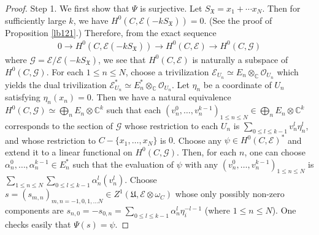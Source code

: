 \documentclass[12pt,a4paper,notitlepage]{report}
\theoremstyle{definition}
\theoremstyle{plain}
\newcommand{\fk}{\mathfrak}
\newcommand{\wtd}{\widetilde}
\newcommand{\scr}{\mathscr}
\newcommand{\SX}{S_{\fk X}}
\newcommand{\Cbb}{\mathbb C}
\numberwithin{equation}{section}
\begin{document}
\begin{proof}
Step 1. We first show that $\Psi$ is surjective. Let $\SX=x_1+\cdots x_N$. Then for sufficiently large $k$, we have $H^0(C,\scr E(-k\SX))=0$. (See the proof of Proposition \ref{lb121}.) Therefore, from the exact sequence
\begin{align*}
0\rightarrow H^0(C,\scr E(-k\SX))\rightarrow H^0(C,\scr E)\rightarrow H^0(C,\scr G)
\end{align*} 
where $\scr G=\scr E/\scr E(-k\SX)$, we see that $H^0(C,\scr E)$ is naturally a subspace of $H^0(C,\scr G)$. For each $1\leq n\leq N$, choose a trivilization $\scr E_{U_n}\simeq E_n\otimes_\Cbb\scr O_{U_n}$ which yields the dual trivilization $\scr E_{U_n}^*\simeq E_n^*\otimes_\Cbb\scr O_{U_n}$. Let $\eta_n$ be a coordinate of $U_n$ satisfying $\eta_n(x_n)=0$. Then we have a natural equivalence $H^0(C,\scr G)\simeq\bigoplus_n E_n\otimes \Cbb^k$ such that each  $(v_n^0,\dots,v_n^{k-1})_{1\leq n\leq N}\in \bigoplus_n E_n\otimes \Cbb^k$   corresponds to the section of $\scr G$ whose restriction to each $U_n$ is $\sum_{0\leq l\leq k-1}v_n^l\eta_n^l$, and whose restriction to $C-\{x_1,\dots,x_N\}$ is $0$. Choose any $\psi\in H^0(C,\scr E)^*$ and extend it to a linear functional on $H^0(C,\scr G)$. Then, for each $n$, one can choose $\alpha_n^0,\dots,\alpha_n^{k-1}\in E_n^*$ such that the evaluation of $\psi$ with any $(v_n^0,\dots,v_n^{k-1})_{1\leq n\leq N}$ is $\sum_{1\leq n\leq N}\sum_{0\leq l\leq k-1}\alpha_n^l(v_n^l)$. Choose $s=(s_{m,n})_{m,n=-1,0,1,\dots N}\in Z^1(\fk U,\scr E\otimes\omega_C)$ whose only possibly non-zero components are $s_{n,0}=-s_{0,n}=\sum_{0\leq l\leq k-1}\alpha_n^l\eta_i^{-l-1}$ (where $1\leq n\leq N$). One checks easily that $\Psi(s)=\psi$.








\end{proof}
\end{document}
